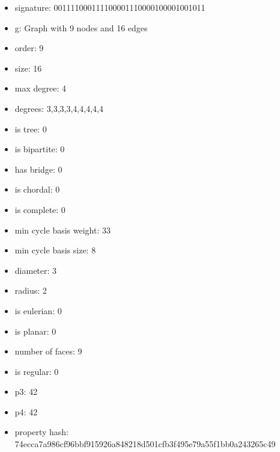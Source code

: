 \newpage
\begin{figure}
\end{figure}
\begin{itemize}
\item signature: 001111000111100001110000100001001011
\item g: Graph with 9 nodes and 16 edges
\item order: 9
\item size: 16
\item max degree: 4
\item degrees: 3,3,3,3,4,4,4,4,4
\item is tree: 0
\item is bipartite: 0
\item has bridge: 0
\item is chordal: 0
\item is complete: 0
\item min cycle basis weight: 33
\item min cycle basis size: 8
\item diameter: 3
\item radius: 2
\item is eulerian: 0
\item is planar: 0
\item number of faces: 9
\item is regular: 0
\item p3: 42
\item p4: 42
\item property hash: 74ecca7a986cf96bbf915926a848218d501cfb3f495e79a55f1bb0a243265c49
\end{itemize}
